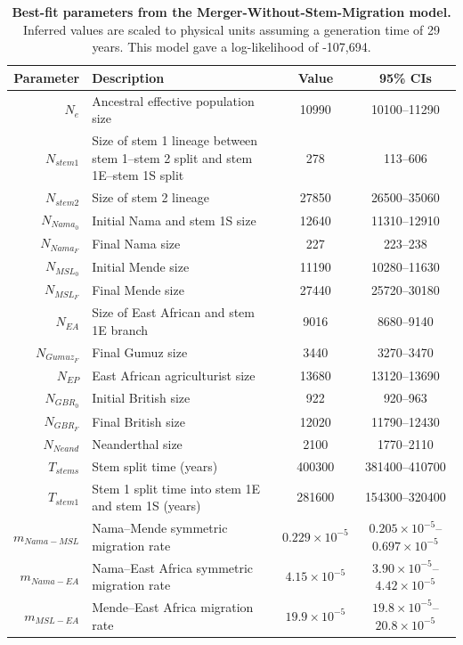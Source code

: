 \documentclass[]{article}
\begin{document}
\begin{table}[ht]
\caption{
    \label{tab:supp-merger-without-stem-migration}
    \textbf{Best-fit parameters from the Merger-Without-Stem-Migration model.}
    Inferred values are scaled to physical units assuming a generation time of
    29 years. This model gave a log-likelihood of -107,694.
}
\centering
\begin{tabular}[t]{rP{8cm}cc}
    \toprule
    Parameter & Description & Value & 95\% CIs\\
    \midrule
    $N_e$ & Ancestral effective population size & 10990 & 10100--11290 \\
    $N_{stem1}$ & Size of stem 1 lineage between stem 1--stem 2 split and stem 1E--stem 1S split & 278 & 113--606 \\
    $N_{stem2}$ & Size of stem 2 lineage & 27850 & 26500--35060 \\
    $N_{Nama_0}$ & Initial Nama and stem 1S size & 12640 & 11310--12910 \\
    $N_{Nama_F}$ & Final Nama size & 227 & 223--238 \\
    $N_{MSL_0}$ & Initial Mende size & 11190 & 10280--11630 \\
    $N_{MSL_F}$ & Final Mende size & 27440 & 25720--30180 \\
    $N_{EA}$ & Size of East African and stem 1E branch & 9016 & 8680--9140 \\
    $N_{Gumuz_F}$ & Final Gumuz size & 3440 & 3270--3470 \\
    $N_{EP}$ & East African agriculturist size & 13680 & 13120--13690 \\
    $N_{GBR_0}$ & Initial British size & 922 & 920--963 \\
    $N_{GBR_F}$ & Final British size & 12020 & 11790--12430 \\
    $N_{Neand}$ & Neanderthal size & 2100 & 1770--2110 \\
    $T_{stems}$ & Stem split time (years) & 400300 & 381400--410700 \\
    $T_{stem1}$ & Stem 1 split time into stem 1E and stem 1S (years) & 281600 & 154300--320400 \\
    $m_{Nama-MSL}$ & Nama--Mende symmetric migration rate & $0.229\times10^{-5}$ & $0.205\times10^{-5}$--$0.697\times10^{-5}$ \\
    $m_{Nama-EA}$ & Nama--East Africa symmetric migration rate & $4.15\times10^{-5}$ & $3.90\times10^{-5}$--$4.42\times10^{-5}$ \\
    $m_{MSL-EA}$ & Mende--East Africa migration rate & $19.9\times10^{-5}$ & $19.8\times10^{-5}$--$20.8\times10^{-5}$ \\

\end{tabular}
\end{table}
\end{document}
